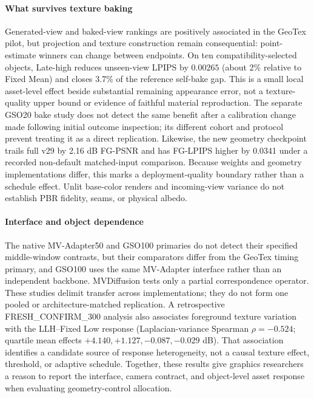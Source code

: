 \documentclass[times,twocolumn,final]{elsarticle}
\begin{document}
\paragraph{What survives texture baking}
Generated-view and baked-view rankings are positively associated in the GeoTex pilot, but projection and texture construction remain consequential: point-estimate winners can change between endpoints. On ten compatibility-selected objects, Late-high reduces unseen-view LPIPS by $0.00265$ (about 2\% relative to Fixed Mean) and closes 3.7\% of the reference self-bake gap. This is a small local asset-level effect beside substantial remaining appearance error, not a texture-quality upper bound or evidence of faithful material reproduction. The separate GSO20 bake study does not detect the same benefit after a calibration change made following initial outcome inspection; its different cohort and protocol prevent treating it as a direct replication. Likewise, the new geometry checkpoint trails full v29 by 2.16 dB FG-PSNR and has FG-LPIPS higher by 0.0341 under a recorded non-default matched-input comparison. Because weights and geometry implementations differ, this marks a deployment-quality boundary rather than a schedule effect. Unlit base-color renders and incoming-view variance do not establish PBR fidelity, seams, or physical albedo.

\paragraph{Interface and object dependence}
The native MV-Adapter50 and GSO100 primaries do not detect their specified middle-window contrasts, but their comparators differ from the GeoTex timing primary, and GSO100 uses the same MV-Adapter interface rather than an independent backbone. MVDiffusion tests only a partial correspondence operator. These studies delimit transfer across implementations; they do not form one pooled or architecture-matched replication. A retrospective FRESH\_CONFIRM\_300 analysis also associates foreground texture variation with the LLH--Fixed Low response (Laplacian-variance Spearman $\rho=-0.524$; quartile mean effects $+4.140,+1.127,-0.087,-0.029$ dB). That association identifies a candidate source of response heterogeneity, not a causal texture effect, threshold, or adaptive schedule. Together, these results give graphics researchers a reason to report the interface, camera contract, and object-level asset response when evaluating geometry-control allocation.
\end{document}
